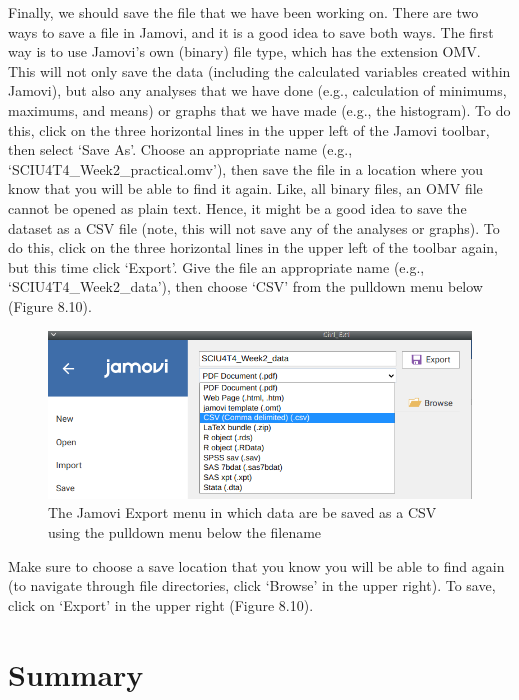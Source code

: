 \documentclass[
]{scrbook}
\begin{document}
Finally, we should save the file that we have been working on.
There are two ways to save a file in Jamovi, and it is a good idea to save both ways.
The first way is to use Jamovi's own (binary) file type, which has the extension OMV.
This will not only save the data (including the calculated variables created within Jamovi), but also any analyses that we have done (e.g., calculation of minimums, maximums, and means) or graphs that we have made (e.g., the histogram).
To do this, click on the three horizontal lines in the upper left of the Jamovi toolbar, then select `Save As'.
Choose an appropriate name (e.g., `SCIU4T4\_Week2\_practical.omv'), then save the file in a location where you know that you will be able to find it again.
Like, all binary files, an OMV file cannot be opened as plain text.
Hence, it might be a good idea to save the dataset as a CSV file (note, this will not save any of the analyses or graphs).
To do this, click on the three horizontal lines in the upper left of the toolbar again, but this time click `Export'.
Give the file an appropriate name (e.g., `SCIU4T4\_Week2\_data'), then choose `CSV' from the pulldown menu below (Figure 8.10).

\begin{figure}
\includegraphics[width=1\linewidth]{img/export_jamovi} \caption{The Jamovi Export menu in which data are be saved as a CSV using the pulldown menu below the filename}\label{fig:unnamed-chunk-31}
\end{figure}

Make sure to choose a save location that you know you will be able to find again (to navigate through file directories, click `Browse' in the upper right).
To save, click on `Export' in the upper right (Figure 8.10).

\hypertarget{summary-1}{%
\section{Summary}\label{summary-1}}
\end{document}
